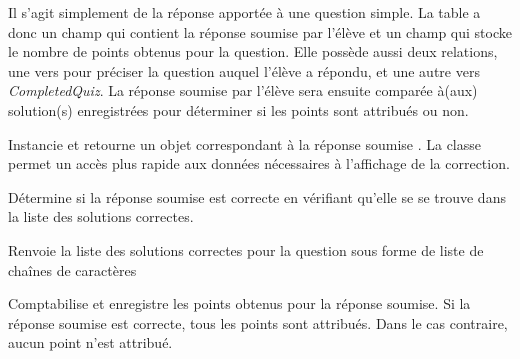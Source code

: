\documentclass[a4,10pt,french]{sphinxmanual}
\begin{document}
\begin{fulllineitems}
\label{database:quiz.models.SqSubmit}
Il s'agit simplement de la réponse apportée à une question simple. La table
a donc un champ  qui contient la réponse soumise par l'élève et un champ
 qui stocke le nombre de points obtenus pour la question. Elle possède
aussi deux relations, une vers  pour préciser la question auquel
l'élève a répondu, et une autre vers \emph{CompletedQuiz}. La réponse soumise par l'élève
sera ensuite comparée à(aux) solution(s) enregistrées pour déterminer si les points
sont attribués ou non.

\begin{fulllineitems}
\label{database:quiz.models.SqSubmit.build_correct}
Instancie et retourne un objet  correspondant à la réponse soumise .
La classe  permet un accès plus rapide aux données nécessaires à
l'affichage de la correction.

\end{fulllineitems}


\begin{fulllineitems}
\label{database:quiz.models.SqSubmit.correct}
Détermine si la réponse soumise est correcte en vérifiant qu'elle se
se trouve dans la liste des solutions correctes.

\end{fulllineitems}


\begin{fulllineitems}
\label{database:quiz.models.SqSubmit.get_corrections}
Renvoie la liste des solutions correctes pour la question sous forme de liste de
chaînes de caractères

\end{fulllineitems}


\begin{fulllineitems}
\label{database:quiz.models.SqSubmit.save_result}
Comptabilise et enregistre les points obtenus pour la réponse soumise. Si la réponse soumise
est correcte, tous les points sont attribués. Dans le cas contraire,
aucun point n'est attribué.


\end{fulllineitems}
\end{fulllineitems}
\end{document}
